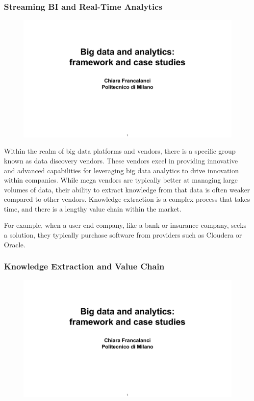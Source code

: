 \subsubsection{Streaming BI and Real-Time Analytics}

\begin{figure}[!h]
    \centering
    \includegraphics[page=58, trim = 0cm 2cm 0cm 4.5cm, clip, width=\textwidth]{images/06 - BIG_DATA.pdf}
\end{figure}

Within the realm of big data platforms and vendors, there is a specific
group known as data discovery vendors. These vendors excel in providing
innovative and advanced capabilities for leveraging big data analytics
to drive innovation within companies. While mega vendors are typically
better at managing large volumes of data, their ability to extract
knowledge from that data is often weaker compared to other vendors.
Knowledge extraction is a complex process that takes time, and there is
a lengthy value chain within the market.

For example, when a user end company, like a bank or insurance company,
seeks a solution, they typically purchase software from providers such
as Cloudera or Oracle.

\subsubsection{Knowledge Extraction and Value Chain}

\begin{figure}[!h]
    \centering
    \includegraphics[page=59, trim = 1cm 0.5cm 2.5cm 3.5cm, clip, width=\textwidth]{images/06 - BIG_DATA.pdf}
\end{figure}

